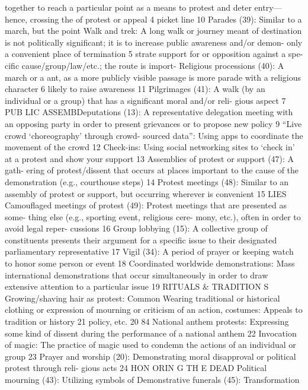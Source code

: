 \documentclass[twoside,a4paper,12pt,fleqn,openany]{extbook}
\begin{document}
together to reach a particular point as a means
 to protest and deter entry—hence, crossing the
of protest or appeal
 4
 picket line
 10
Parades (39): Similar to a march, but the point
 Walk and trek: A long walk or journey meant
of destination is not politically significant; it is
 to increase public awareness and/or demon-
only a convenient place of termination
 5
 strate support for or opposition against a spe-
cific cause/group/law/etc.; the route is import-
Religious processions (40): A march or a
 ant, as a more publicly visible passage is more
parade with a religious character
 6
 likely to raise awareness
 11
Pilgrimages (41): A walk (by an individual or a
group) that has a significant moral and/or reli-
gious aspect
 7
PUB LIC ASSEMBDeputations (13): A representative delegation
meeting with an opposing party in order to
present grievances or to propose new policy		
9
“Live crowd ‘choreography’ through crowd-
sourced data”: Using apps to coordinate the
movement of the crowd
 12
Check-ins: Using social networking sites to
‘check in’ at a protest and show your support
13
Assemblies of protest or support (47): A gath-
ering of protest/dissent that occurs at places
important to the cause of the demonstration
(e.g., courthouse steps)
 14
Protest meetings (48): Similar to an assembly
of protest or support, but occurring wherever
is convenient
 15
LIES
Camouflaged meetings of protest (49):
Protest meetings that are presented as some-
thing else (e.g., sporting event, religious cere-
mony, etc.), often in order to avoid legal reper-
cussions
 16
Group lobbying (15): A collective group of
constituents presents their argument for a
specific issue to their designated parliamentary
representative
 17
Vigil (34): A period of prayer or keeping watch
to honor some person or event
 18
Coordinated worldwide demonstrations:
Mass international demonstrations that occur
simultaneously in order to draw extensive
attention to a particular issue
 19
RITUALS & TRADITION S
Growing/shaving hair as protest: Common
 Wearing traditional or historical clothing or
expression of mourning or criticism of an action,
 costumes: Appeals to tradition or history 21
policy, etc.
 20
84
National anthem protests: Expressing some
kind of dissent during the performance of a
national anthem
 22
Invocation of magic: The practice of magic
used to condemn the actions of an individual
or group
 23
Prayer and worship (20): Demonstrating moral
disapproval or political protest through reli-
gious acts
 24
HON ORIN G TH E DEAD
Political mourning (43): Utilizing symbols of
 Demonstrative funerals (45): Transformation
\end{document}
